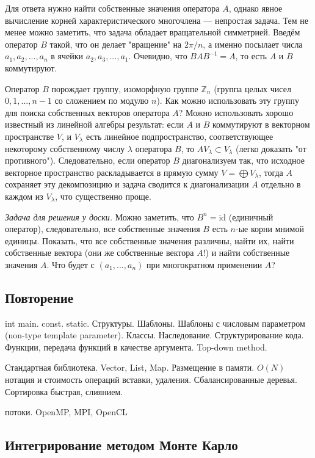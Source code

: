\documentclass{book}
\begin{document}
Для ответа нужно найти собственные значения оператора $A$, однако явное вычисление корней
характеристического многочлена --- непростая задача. Тем не менее можно заметить, что задача
обладает вращательной симметрией. Введём оператор $B$ такой, что он делает "вращение" на $2 \pi
/ n$, а именно посылает числа $a_1, a_2, ..., a_n$ в ячейки $a_2, a_3, ..., a_1$. Очевидно, что
$B A B^{-1} = A$, то есть $A$ и $B$ коммутируют.

Оператор $B$ порождает группу, изоморфную группе $\mathbb Z_n$ (группа целых чисел ${0, 1, ..., n -
1}$ со сложением по модулю $n$). Как можно использовать эту группу для поиска собственных
векторов оператора $A$? Можно использовать хорошо известный из линейной алгебры результат: если
$A$ и $B$ коммутируют в векторном пространстве $V$, и $V_\lambda$ есть линейное
подпространство, соответствующее некоторому собственному числу $\lambda$ оператора $B$, то $A
V_\lambda \subset V_\lambda$ (легко доказать "от противного"). Следовательно, если оператор $B$
диагонализуем так, что исходное векторное пространство раскладывается в прямую сумму $V =
\bigoplus V_\lambda$, тогда $A$ сохраняет эту декомпозицию и задача сводится к диагонализации
$A$ отдельно в каждом из $V_\lambda$, что существенно проще.

\textit{Задача для решения у доски.} Можно заметить, что $B^n = \mathrm{id}$ (единичный оператор), следовательно, все
собственные значения $B$ есть $n$-ые корни мнимой единицы. Показать, что все собственные значения
различны, найти их, найти собственные вектора (они же собственные вектора $A$!) и найти собственные
значения $A$. Что будет с $(a_1, ..., a_n)$ при многократном применении $A$?

\subsection{Повторение}

int main. const. static. Структуры. Шаблоны. Шаблоны с числовым параметром (non-type template parameter). Классы.
Наследование. 
Структурирование кода. Функции, передача функций в качестве аргумента. Top-down method. 

Стандартная библиотека. Vector, List, Map. Размещение в памяти. $O(N)$ нотация и стоимость операций
вставки, удаления. Сбалансированные деревья. Сортировка быстрая, слиянием.

потоки. OpenMP, MPI, OpenCL

\subsection{Интегрирование методом Монте Карло}
\end{document}

